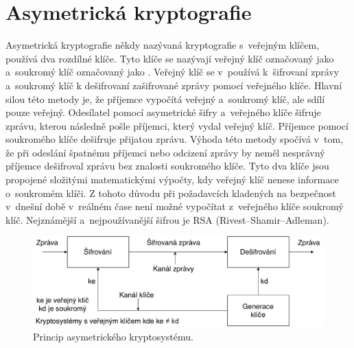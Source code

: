 \section{Asymetrická kryptografie}
Asymetrická kryptografie někdy nazývaná kryptografie s~veřejným klíčem, používá dva rozdílné klíče. Tyto klíče se nazývají veřejný klíč označovaný jako  a~soukromý klíč označovaný jako . Veřejný klíč se v~používá k~šifrovaní zprávy a~soukromý klíč k dešifrovaní zašifrované zprávy pomocí veřejného klíče. Hlavní silou této metody je, že příjemce vypočítá veřejný a~soukromý klíč, ale sdílí pouze veřejný. Odesílatel pomocí asymetrické šifry a~veřejného klíče šifruje zprávu, kterou následně pošle příjemci, který vydal veřejný klíč. Příjemce pomocí soukromého klíče dešifruje přijatou zprávu. Výhoda této metody spočívá v~tom, že při odeslání špatnému příjemci nebo odcizení zprávy by neměl nesprávný příjemce dešifroval zprávu bez znalosti soukromého klíče. Tyto dva klíče jsou propojené složitými matematickými výpočty, kdy veřejný klíč nenese informace o~soukromém klíči. Z tohoto důvodu při požadavcích kladených na bezpečnost v~dnešní době v~reálném čase není možné vypočítat z~veřejného klíče soukromý klíč. Nejznámější a~nejpoužívanější šifrou je RSA
(Rivest–Shamir–Adleman).\cite{Nigel9780077099879ISBN}
\newpage
\begin{figure}[!h]
  \begin{center}
    \includegraphics[scale=0.5]{obrazky/AsymmetricCrutosystem.pdf}
  \end{center}
  \caption[Princip asymetrického kryptosystému]{Princip asymetrického kryptosystému.\footnotemark\cite{Mao0130669431ISBN}}
  \label{img:asymmetricCrypto}
\end{figure}
